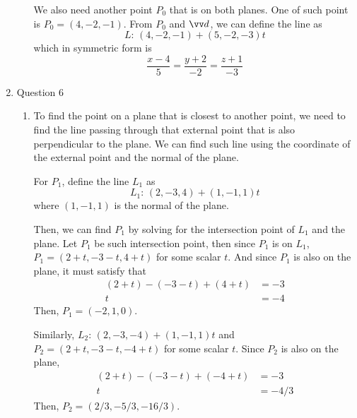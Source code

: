 \documentclass[11pt]{article}
\begin{document}
\begin{enumerate}
\begin{enumerate}
        We also need another point $P_0$ that is on both planes. One of such point is $P_0 = (4,-2,-1)$. From $P_0$ and $\vv d$, we can define the line as
        $$
        L:\, (4,-2,-1) + (5,-2,-3)t
        $$
        which in symmetric form is
        $$
        \frac{x-4}{5} = \frac{y+2}{-2} = \frac{z+1}{-3}
        $$
    \end{enumerate}
    
    \item Question 6
    \begin{enumerate}
        \item To find the point on a plane that is closest to another point, we need to find the line passing through that external point that is also perpendicular to the plane. We can find such line using the coordinate of the external point and the normal of the plane.
        
        For $P_1$, define the line $L_1$ as
        $$
        L_1:\, (2,-3,4)+(1,-1,1)t
        $$
        where $(1,-1,1)$ is the normal of the plane.
        
        Then, we can find $P_1$ by solving for the intersection point of $L_1$ and the plane. Let $P_1$ be such intersection point, then since $P_1$ is on $L_1$, $P_1=(2+t,-3-t,4+t)$ for some scalar $t$. And since $P_1$ is also on the plane, it must satisfy that
        \begin{align*}
            (2+t) - (-3-t) + (4+t) &= -3 \\
            t &= -4
        \end{align*}
        Then, $P_1=(-2,1,0)$.
        
        Similarly, $L_2:\, (2,-3,-4)+(1,-1,1)t$ and $P_2=(2+t,-3-t,-4+t)$ for some scalar $t$. Since $P_2$ is also on the plane,
        \begin{align*}
            (2+t) - (-3-t) + (-4+t) &= -3 \\
            t &= -4/3
        \end{align*}
        Then, $P_2=(2/3, -5/3, -16/3)$.
        

\end{enumerate}
\end{enumerate}
\end{document}
